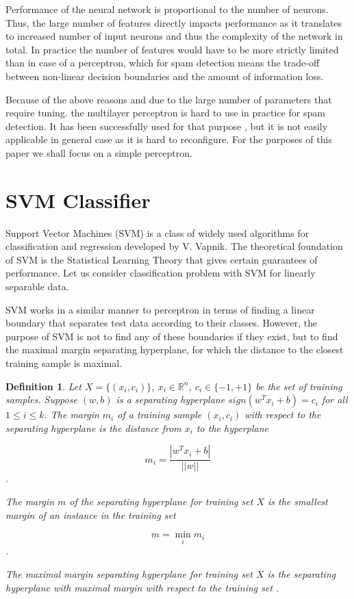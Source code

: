 \documentclass[12pt]{report}
\newcommand{\re}{\mathbb{R}}
\newtheorem{definition}{Definition}[section]
\begin{document}
Performance of the neural network is proportional to the number of neurons. Thus, the large number of features directly impacts performance as it translates to increased number of input neurons and thus the complexity of the network in total. In practice the number of features would have to be more strictly limited than in case of a perceptron, which for spam detection means the trade-off between non-linear decision boundaries and the amount of information loss.

Because of the above reasons and due to the large number of parameters that require tuning. the multilayer perceptron is hard to use in practice for spam detection. It has been successfully used for that purpose \cite{Tretyakov}, but it is not easily applicable in general case as it is hard to reconfigure. For the purposes of this paper we shall focus on a simple perceptron.

\newpage

\section{SVM Classifier}

Support Vector Machines (SVM) is a class of widely used algorithms for classification and regression developed by V. Vapnik. The theoretical foundation of SVM is the Statistical Learning Theory that gives certain guarantees of performance. Let us consider classification problem with SVM for linearly separable data.

SVM works in a similar manner to perceptron in terms of finding a linear boundary that separates test data according to their classes. However, the purpose of SVM is not to find any of these boundaries if they exist, but to find the maximal margin separating hyperplane, for which the distance to the closest training sample is maximal.

\begin{definition}
	Let $X = \{(x_i, c_i)\}$, $x_i \in \re^n$, $c_i \in \{-1, +1\}$ be the set of training samples. Suppose $(w, b)$ is a separating hyperplane $sign(w^T x_i + b) = c_i$ for all $1 \leq i \leq k$. The margin $m_i$ of a training sample $(x_i, c_i)$ with respect to the separating hyperplane is the distance from $x_i$ to the hyperplane
	
	$$m_i = \dfrac{|w^T x_i + b|}{||w||}$$.
	
	The margin $m$ of the separating hyperplane for training set $X$ is the smallest margin of an instance in the training set
	
	$$m = \min_i m_i$$.
	
	The maximal margin separating hyperplane for training set $X$ is the separating hyperplane with maximal margin with respect to the training set \cite{Tretyakov}.
\end{definition}
\end{document}
